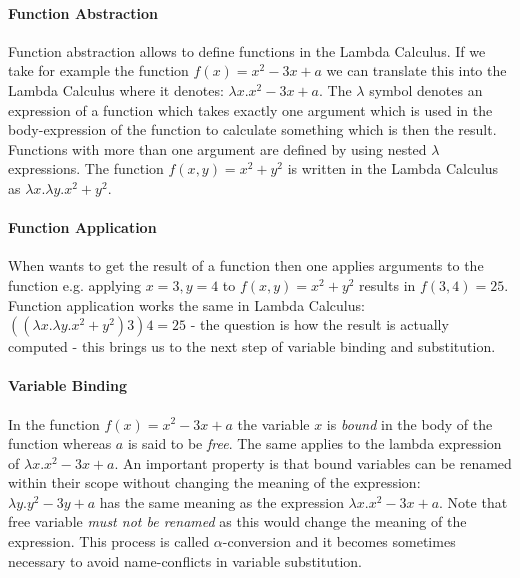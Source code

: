 \paragraph{Function Abstraction}
Function abstraction allows to define functions in the Lambda Calculus. If we take for example the function $f(x) = x^2 - 3x + a$ we can translate this into the Lambda Calculus where it denotes: $\lambda x.x^2 - 3x + a$. The $\lambda$ symbol denotes an expression of a function which takes exactly one argument which is used in the body-expression of the function to calculate something which is then the result. Functions with more than one argument are defined by using nested $\lambda$ expressions. The function $f(x, y) = x^2 + y^2$ is written in the Lambda Calculus as $\lambda x.\lambda y.x^2 + y^2$.

\paragraph{Function Application}
When wants to get the result of a function then one applies arguments to the function e.g. applying $x = 3, y = 4$ to $f(x, y) = x^2 + y^2$ results in $f(3, 4) = 25$. Function application works the same in Lambda Calculus: $((\lambda x.\lambda y.x^2 + y^2) 3) 4 = 25$ - the question is how the result is actually computed - this brings us to the next step of variable binding and substitution.

\paragraph{Variable Binding}
In the function $f(x) = x^2 - 3x + a$ the variable $x$ is \textit{bound} in the body of the function whereas $a$ is said to be \textit{free}. The same applies to the lambda expression of $\lambda x.x^2 - 3x + a$. An important property is that bound variables can be renamed within their scope without changing the meaning of the expression: $\lambda y.y^2 - 3y + a$ has the same meaning as the expression $\lambda x.x^2 - 3x + a$. Note that free variable \textit{must not be renamed} as this would change the meaning of the expression. This process is called $\alpha$-conversion and it becomes sometimes necessary to avoid name-conflicts in variable substitution.

